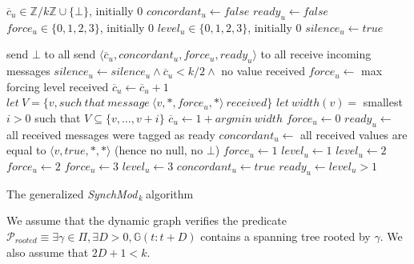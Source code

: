 \documentclass[11pt,letterpaper]{article}
\newcommand{\cent}{\gamma}
\newcommand{\SM}{{\em SynchMod}$_{\,k}\ $}
\begin{document}
\begin{algorithm}[htb]\label{algo:code}
\begin{distribalgo}[1]
\BLANK {}
	\STATE $\overline{c}_u \in \mathds{Z}/k\mathds{Z} \cup \{\bot\}$, initially 0
	\STATE $concordant_u \leftarrow false$
	\STATE $ready_u \leftarrow false$
	\STATE $force_u \in \{0, 1, 2, 3\}$, initially 0
	\STATE $level_u \in \{0, 1, 2, 3\}$, initially 0
	\STATE $silence_u \leftarrow true$

\ENDINDENT \BLANK

		\STATE send $\bot$ to all 
	\ELSE
		\STATE send $\langle \overline{c}_u, concordant_u, force_u, ready_u \rangle$ to all 
	\ENDIF
	\STATE receive incoming messages
	\STATE $silence_u \leftarrow silence_u \wedge \overline{c}_u < k/2 \wedge$ no value received
	\STATE $force_u \leftarrow$ max forcing level received \label{line:force}
		\STATE $\overline{c}_u \leftarrow \overline{c}_u+1$ \label{line:straight-increment}
	\ELSE
		\STATE $let~V = \{v, such~that~message~\langle v, *, force_u, * \rangle~received\}$ \label{line:min-z}
		\STATE $let~width(v) =$ smallest $i > 0$ such that $V \subseteq \{v, \dots, v+i\}$
		\STATE $\overline{c}_u \leftarrow 1+argmin~width$ \label{line:min-z-end}
	\ENDIF
		\STATE $force_u \leftarrow 0$ \label{line:back-to-0}
	\ENDIF
	\STATE $ready_u \leftarrow$ all received messages were tagged as ready
	\STATE $concordant_u \leftarrow$ all received values are equal to $\langle v, true, *, * \rangle$ (hence no null, no $\bot$) \label{line:conc-gossip}
			\STATE $force_u \leftarrow 1$
			\STATE $level_u \leftarrow 1$
		\ENDIF
			\STATE $level_u \leftarrow 2$
			\STATE $force_u \leftarrow 2$ \label{line:force2}
		\ENDIF
			\STATE $force_u \leftarrow 3$
			\STATE $level_u \leftarrow 3$
		\ENDIF
		\STATE $concordant_u \leftarrow true$ \label{line:conc-true}
		\STATE $ready_u \leftarrow level_u > 1$ \label{line:init-ready}
	\ENDIF
\ENDINDENT 

\caption{The generalized \SM algorithm} \label{algo:R}
\end{distribalgo}

\end{algorithm}

We assume that the dynamic graph verifies the predicate $\mathcal{P}_{rooted} \equiv \exists \cent \in \Pi, \exists D > 0, \mathds{G}(t:t+D)$ contains a spanning tree rooted by $\cent$.
We also assume that $2D+1 < k$.
\end{document}
